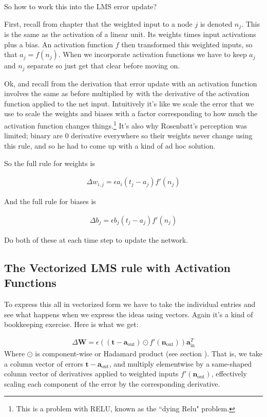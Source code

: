 So how to work this into the LMS error update?

First, recall from chapter  that the weighted input to a node $j$ is denoted $n_j$. This is the same as the activation of a linear unit. Its weights times input activations plus a bias. An activation function $f$ then transformed this weighted inputs, so that $a_j = f(n_j)$. When we incorporate activation functions we have to keep $a_j$ and $n_j$ separate so just get that clear before moving on.

Ok, and recall from the derivation that error update with an activation function involves the same as before multiplied by with the derivative of the activation function applied to the net input. Intuitively it's like we scale the error that we use to scale the weights and biases with a factor corresponding to how much the activation function changes things.\footnote{This is a problem with RELU, known as the ``dying Relu" problem.}  It's also why Rosenbatt's perception was limited; binary are 0 derivative everywhere so their weights never change using this rule, and so he had to come up with a kind of ad hoc solution.

So the full rule for weights is

\begin{eqnarray*}
\Delta w_{i,j}  =  \epsilon a_i (t_j - a_j) f' (n_j)
\end{eqnarray*}

And the full rule for biases is 

\begin{eqnarray*}
\Delta b_{j}  =  \epsilon b_j (t_j - a_j) f' (n_j)
\end{eqnarray*}

Do both of these at each time step to update the network.

\subsection{The Vectorized LMS rule with Activation Functions}

To express this all in vectorized form we have to take the individual entries and see what happens when we express the ideas using vectors.  Again it's a kind of bookkeeping exercise. Here is what we get:

\begin{eqnarray*}
\Delta \mathbf{W}  =  \epsilon ((\mathbf{t} - \mathbf{a}_{\text{out}}) \odot f'( \mathbf{n}_{\text{out}})) \mathbf{a}_{\text{in}}^T
\end{eqnarray*}
Where $\odot$ is component-wise or Hadamard product (see section ). That is, we take a column vector of errors $\mathbf{t} - \mathbf{a}_{\text{out}}$, and multiply elementwise by a same-shaped column vector of derivatives applied to weighted inputs $f'( \mathbf{n}_{\text{out}})$, effectively scaling each component of the error by the corresponding derivative. 

